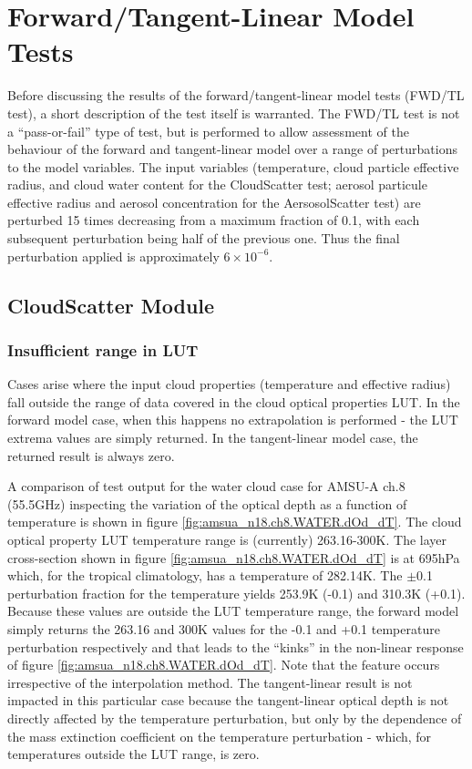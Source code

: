 \section{Forward/Tangent-Linear Model Tests}
Before discussing the results of the forward/tangent-linear model tests (FWD/TL test), a short description of the test itself is warranted. The FWD/TL test is not a ``pass-or-fail'' type of test, but is performed to allow assessment of the behaviour of the forward and tangent-linear model over a range of perturbations to the model variables. The input variables (temperature, cloud particle effective radius, and cloud water content for the CloudScatter test; aerosol particule effective radius and aerosol concentration for the AersosolScatter test) are perturbed 15 times decreasing from a maximum fraction of 0.1, with each subsequent perturbation being half of the previous one. Thus the final perturbation applied is approximately $6\times 10^{-6}$.
 
 
\subsection{CloudScatter Module}
\subsubsection{Insufficient range in LUT}
\label{sec:Insufficient.LUT.range.Cloud}
Cases arise where the input cloud properties (temperature and effective radius) fall outside the range of data covered in the cloud optical properties LUT. In the forward model case, when this happens no extrapolation is performed - the LUT extrema values are simply returned. In the tangent-linear model case, the returned result is always zero.

A comparison of test output for the water cloud case for AMSU-A ch.8 (55.5GHz) inspecting the variation of the optical depth as a function of temperature is shown in figure \ref{fig:amsua_n18.ch8.WATER.dOd_dT}. The cloud optical property LUT temperature range is (currently) 263.16-300K. The layer cross-section shown in figure \ref{fig:amsua_n18.ch8.WATER.dOd_dT} is at 695hPa which, for the tropical climatology, has a temperature of 282.14K. The $\pm$0.1 perturbation fraction for the temperature yields 253.9K (-0.1) and 310.3K (+0.1). Because these values are outside the LUT temperature range, the forward model simply returns the 263.16 and 300K values for the -0.1 and +0.1 temperature perturbation respectively and that leads to the ``kinks'' in the non-linear response of figure \ref{fig:amsua_n18.ch8.WATER.dOd_dT}. Note that the feature occurs irrespective of the interpolation method. The tangent-linear result is not impacted in this particular case because the tangent-linear optical depth is not directly affected by the temperature perturbation, but only by the dependence of the mass extinction coefficient on the temperature perturbation - which, for temperatures outside the LUT range, is zero.

